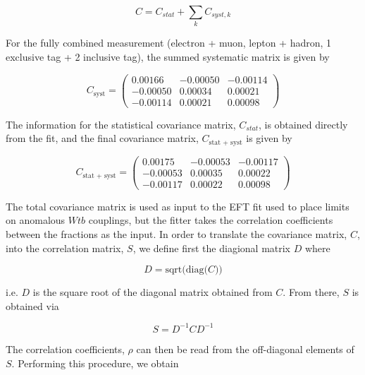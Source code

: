 \begin{equation}
C = C_{stat} + \sum_k C_{syst, k}
\end{equation}

For the fully combined measurement (electron + muon, lepton + hadron, 1 exclusive \bt tag + 2 inclusive \bt tag), the summed systematic matrix is given by

\begin{equation}
 C_{\text{syst}} = \left( \begin{array}{ccc}
    0.00166  &  -0.00050  &  -0.00114  \\
   -0.00050  &   0.00034  &   0.00021   \\
   -0.00114  &   0.00021  &   0.00098
\end{array} \right) 
\end{equation}

The information for the statistical covariance matrix, $C_{stat}$, is obtained directly from the fit, and the final covariance matrix, $C_{\text{stat + syst}}$ is given by

\begin{equation}
 C_{\text{stat + syst}} = \left( \begin{array}{ccc}
    0.00175  &  -0.00053  &  -0.00117  \\
   -0.00053  &   0.00035  &   0.00022   \\
   -0.00117  &   0.00022  &   0.00098
\end{array} \right) 
\end{equation}

The total covariance matrix is used as input to the EFT fit used to place limits on anomalous $Wtb$ couplings, but the fitter takes the correlation coefficients between the fractions as the input. In order to translate the covariance matrix, $C$, into the correlation matrix, $S$, we define first the diagional matrix $D$ where

\begin{equation}
D = \text{sqrt(}\text{diag(}C))
\end{equation}

i.e. $D$ is the square root of the diagonal matrix obtained from $C$. From there, $S$ is obtained via

\begin{equation}
S = D^{-1} C D^{-1}
\end{equation}

The correlation coefficients, $\rho$ can then be read from the off-diagonal elements of $S$. Performing this procedure, we obtain

